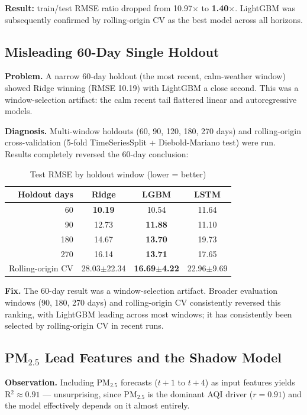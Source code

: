 \documentclass[11pt,a4paper]{article}
\begin{document}
\noindent\textbf{Result:}\; train/test RMSE ratio dropped from 10.97$\times$ to
\textbf{1.40$\times$}. LightGBM was subsequently confirmed by rolling-origin CV
as the best model across all horizons.

\subsection{Misleading 60-Day Single Holdout}

\textbf{Problem.}\; A narrow 60-day holdout (the most recent, calm-weather window)
showed Ridge winning (RMSE 10.19) with LightGBM a close second. This was a
window-selection artifact: the calm recent tail flattered linear and autoregressive
models.

\textbf{Diagnosis.}\; Multi-window holdouts (60, 90, 120, 180, 270 days) and
rolling-origin cross-validation (5-fold TimeSeriesSplit + Diebold-Mariano test)
were run. Results completely reversed the 60-day conclusion:

\begin{table}[H]
\centering
\caption{Test RMSE by holdout window (lower = better)}
\begin{tabular}{rccc}
\toprule
\textbf{Holdout days} & \textbf{Ridge} & \textbf{LGBM} & \textbf{LSTM} \\
\midrule
60  & \textbf{10.19} & 10.54 & 11.64 \\
90  & 12.73 & \textbf{11.88} & 11.10 \\
180 & 14.67 & \textbf{13.70} & 19.73 \\
270 & 16.14 & \textbf{13.71} & 17.65 \\
Rolling-origin CV & 28.03$\pm$22.34 & \textbf{16.69$\pm$4.22} & 22.96$\pm$9.69 \\
\bottomrule
\end{tabular}
\end{table}

\textbf{Fix.}\; The 60-day result was a window-selection artifact.  Broader
evaluation windows (90, 180, 270 days) and rolling-origin CV consistently
reversed this ranking, with LightGBM leading across most windows; it has
consistently been selected by rolling-origin CV in recent runs.

\subsection{PM$_{2.5}$ Lead Features and the Shadow Model}

\textbf{Observation.}\; Including PM$_{2.5}$ forecasts ($t{+}1$ to $t{+}4$) as
input features yields R$^2\approx0.91$ — unsurprising, since PM$_{2.5}$ is the
dominant AQI driver ($r=0.91$) and the model effectively depends on it almost
entirely.
\end{document}
